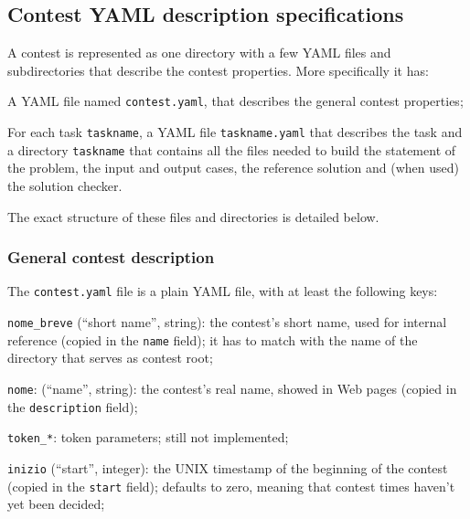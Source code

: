 \documentclass[a4paper,8pt]{amsart}
\newenvironment{squishlist}{%
  \begin{list}{\textbullet}%
    { \setlength{\itemsep}{0pt}%
      \setlength{\parsep}{3pt}%
      \setlength{\topsep}{3pt}%
      \setlength{\partopsep}{0pt}%
      \setlength{\leftmargin}{1.5em}%
      \setlength{\labelwidth}{1em}%
      \setlength{\labelsep}{0.5em} }%
}{\end{list}}
\newcommand{\id}[1]{\texttt{#1}}
\newcommand{\file}[1]{\texttt{#1}}
\begin{document}
\begin{multicols}{2}
  \subsection{Contest YAML description specifications}

  A contest is represented as one directory with a few YAML files and
  subdirectories that describe the contest properties. More
  specifically it has:

  \begin{squishlist}

  \item A YAML file named \file{contest.yaml}, that describes the
    general contest properties;

  \item For each task \id{taskname}, a YAML file \file{taskname.yaml}
    that describes the task and a directory \file{taskname} that
    contains all the files needed to build the statement of the
    problem, the input and output cases, the reference solution and
    (when used) the solution checker.

  \end{squishlist}

  The exact structure of these files and directories is detailed
  below.

  \subsubsection{General contest description}

  The \file{contest.yaml} file is a plain YAML file, with at least the
  following keys:

  \begin{squishlist}

  \item \id{nome\_breve} (``short name'', string): the contest's short
    name, used for internal reference (copied in the \id{name} field);
    it has to match with the name of the directory that serves as
    contest root;

  \item \id{nome}: (``name'', string): the contest's real name, showed
    in Web pages (copied in the \id{description} field);

  \item \id{token\_*}: token parameters; still not implemented; %

  \item \id{inizio} (``start'', integer): the UNIX timestamp of the
    beginning of the contest (copied in the \id{start} field);
    defaults to zero, meaning that contest times haven't yet been
    decided;


\end{squishlist}
\end{multicols}
\end{document}
